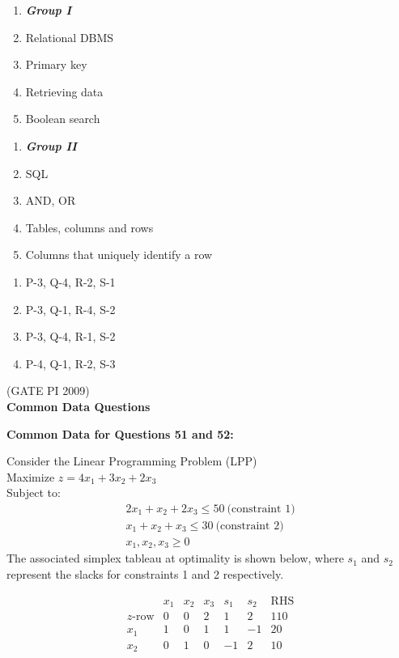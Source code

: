\documentclass[journal,12pt,onecolumn]{IEEEtran}
\theoremstyle{remark}
\begin{document}
\begin{enumerate}
\begin{multicols}{2}
\begin{enumerate}[label=\Alph*.]
    \item[]  \textit{\textbf{Group I}}
    \item Relational DBMS
    \item Primary key
    \item Retrieving data
    \item Boolean search
\end{enumerate}
\columnbreak
\begin{enumerate}[label=\arabic*.]
    \item[] \textit{\textbf{Group II}}
    \item SQL
    \item AND, OR
    \item Tables, columns and rows
    \item Columns that uniquely identify a row
\end{enumerate}
\end{multicols}


\begin{multicols}{2}
\begin{enumerate}
    \item P-3, Q-4, R-2, S-1
    \item P-3, Q-1, R-4, S-2
    \item P-3, Q-4, R-1, S-2
    \item P-4, Q-1, R-2, S-3 
\end{enumerate}
\end{multicols}
\hfill (GATE PI 2009) \\

\textbf{\large{Common Data Questions}}

\textbf{Common Data for Questions 51 and 52:}

Consider the Linear Programming Problem (LPP)\\
Maximize  $ z = 4x_1 + 3x_2 + 2x_3 $ \\
Subject to:
\begin{align*}
2x_1 + x_2 + 2x_3 \leq 50\  \text{(constraint 1)}   \\ 
x_1 + x_2 + x_3 \leq 30\  \text{(constraint 2)} \\
x_1, x_2, x_3 \geq 0  
\end{align*}
The associated simplex tableau at optimality is shown below, where $s_1$ and $s_2$ represent the slacks for constraints 1 and 2 respectively.

$$\begin{array}{c|ccccc|c}
\text{} & x_1 & x_2 & x_3 & s_1 & s_2 & \text{RHS} \\ \hline
z\text{-row} & 0 & 0 & 2 & 1 & 2 & 110 \\ \hline
x_1 & 1 & 0 & 1 & 1 & -1 & 20 \\
x_2 & 0 & 1 & 0 & -1 & 2 & 10 \\
\end{array}
$$


\end{enumerate}
\end{document}
